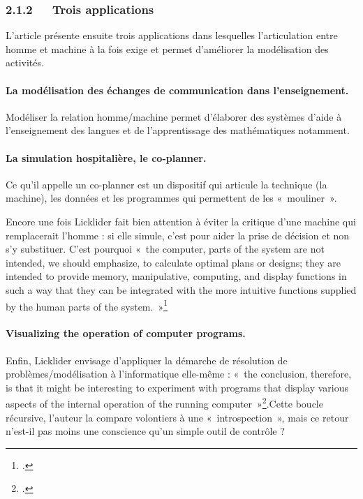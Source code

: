 \documentclass{FramateX}
\begin{document}
\begin{refsection}
\subsubsection*{2.1.2~~~Trois applications}
{}



L'article présente ensuite trois applications dans lesquelles
l'articulation entre homme et machine à la fois exige et permet
d'améliorer la modélisation des activités. 





\paragraph{La modélisation des échanges de communication dans l'enseignement.} Modéliser la relation homme/machine permet d'élaborer des systèmes
d'aide à l'enseignement des langues et de l'apprentissage des
mathématiques notamment. 

\paragraph{La simulation hospitalière, le co-planner.} Ce qu'il appelle un co-planner est un dispositif qui articule la
technique (la machine), les données et les programmes qui permettent de
les «~mouliner~».

Encore une fois Licklider fait bien attention à éviter la critique
d'une machine qui remplacerait l'homme : si elle simule, c'est pour
aider la prise de décision et non s'y substituer. C'est pourquoi «~the
computer, parts of the system are not intended, we should emphasize, to
calculate optimal plans or designs; they are intended to provide
memory, manipulative, computing, and display functions in such a way
that they can be integrated with the more intuitive functions supplied
by the human parts of the system.~»\footnote{\cite[p.~118]{lickliderline1962}.}


\paragraph{Visualizing the operation of computer programs.} Enfin, Licklider envisage d'appliquer la démarche de résolution de
problèmes/modélisation à l'informatique elle-même : «~the conclusion,
therefore, is that it might be interesting to experiment with programs
that display various aspects of the internal operation of the running
computer~»\footnote{\cite[p.~119]{lickliderline1962}.}.Cette boucle récursive, l'auteur la compare
volontiers à une «~introspection~», mais ce retour n'est-il pas
moins une conscience qu'un simple outil de contrôle ?



\end{refsection}
\end{document}
